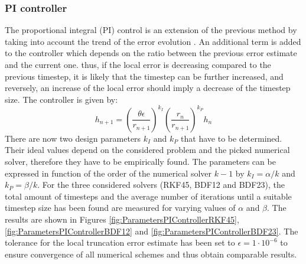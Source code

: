 \documentclass{report}
\begin{document}
\subsubsection{PI controller}
The proportional integral (PI) control is an extension of the previous method by taking into account the trend of the error evolution \cite{AutomControlAdaptTS}. An additional term is added to the controller which depends on the ratio between the previous error estimate and the current one. thus, if the local error is decreasing compared to the previous timestep, it is likely that the timestep can be further increased, and reversely, an increase of the local error should imply a decrease of the timestep size. The controller is given by:
\begin{equation}
h_{n+1} = \left(\frac{\theta\epsilon}{r_{n+1}}\right)^{k_I} \left(\frac{r_n}{r_{n+1}}\right)^{k_P} h_n 
\end{equation}
There are now two design parameters $k_I$ and $k_P$ that have to be determined. Their ideal values depend on the considered problem and the picked numerical solver, therefore they have to be empirically found. The parameters can be expressed in function of the order of the numerical solver $k-1$ by $k_I = \alpha / k$ and $k_P = \beta / k$. For the three considered solvers (RKF45, BDF12 and BDF23), the total amount of timesteps and the average number of iterations until a suitable timestep size has been found are measured for varying values of $\alpha$ and $\beta$. The results are shown in Figures \ref{fig:ParametersPIControllerRKF45},  \ref{fig:ParametersPIControllerBDF12} and  \ref{fig:ParametersPIControllerBDF23}. The tolerance for the local truncation error estimate has been set to $\epsilon=1\cdot 10^{-6}$ to ensure convergence of all numerical schemes and thus obtain comparable results. 
\end{document}
